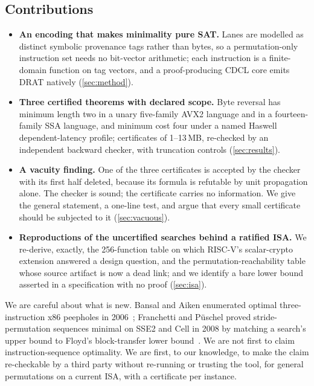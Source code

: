 \subsection{Contributions}

\begin{itemize}
\item \textbf{An encoding that makes minimality pure SAT.} Lanes are modelled as distinct symbolic provenance tags rather than bytes, so a permutation-only instruction set needs no bit-vector arithmetic; each instruction is a finite-domain function on tag vectors, and a proof-producing CDCL core emits DRAT natively (\cref{sec:method}).
\item \textbf{Three certified theorems with declared scope.} Byte reversal has minimum length two in a unary five-family AVX2 language and in a fourteen-family SSA language, and minimum cost four under a named Haswell dependent-latency profile; certificates of 1--13\,MB, re-checked by an independent backward checker, with truncation controls (\cref{sec:results}).
\item \textbf{A vacuity finding.} One of the three certificates is accepted by the checker with its first half deleted, because its formula is refutable by unit propagation alone. The checker is sound; the certificate carries no information. We give the general statement, a one-line test, and argue that every small certificate should be subjected to it (\cref{sec:vacuous}).
\item \textbf{Reproductions of the uncertified searches behind a ratified ISA.} We re-derive, exactly, the 256-function table on which RISC-V's scalar-crypto extension answered a design question, and the permutation-reachability table whose source artifact is now a dead link; and we identify a bare lower bound asserted in a specification with no proof (\cref{sec:isa}).
\end{itemize}

We are careful about what is new. Bansal and Aiken enumerated optimal three-instruction x86 peepholes in 2006~\cite{bansalaiken}; Franchetti and Püschel proved stride-permutation sequences minimal on SSE2 and Cell in 2008 by matching a search's upper bound to Floyd's block-transfer lower bound~\cite{franchetti2008}. We are not first to claim instruction-sequence optimality. We are first, to our knowledge, to make the claim re-checkable by a third party without re-running or trusting the tool, for general permutations on a current ISA, with a certificate per instance.
